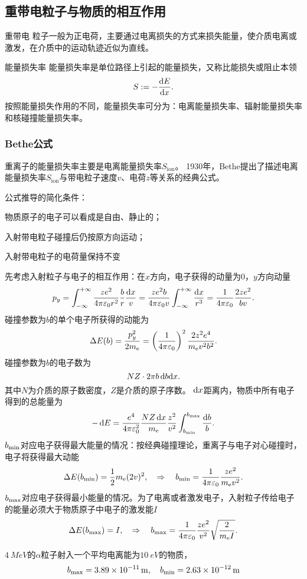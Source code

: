 \subsection{重带电粒子与物质的相互作用}
重带电 粒子一般为正电荷，主要通过电离损失的方式来损失能量，使介质电离或激发，在介质中的运动轨迹近似为直线。
\begin{definition}{能量损失率}{}
	能量损失率是单位路径上引起的能量损失，又称比能损失或阻止本领
	\begin{align}
		S:=-\frac{\mathrm{d}^{\;\!\!}E}{\mathrm{d} x^{\;\!\!}}.
	\end{align}
	按照能量损失作用的不同，能量损失率可分为：电离能量损失率、辐射能量损失率和核碰撞能量损失率。
\end{definition}
\subsubsection{Bethe公式}
重离子的能量损失率主要是电离能量损失率$S_{\mathrm{ion}}$。
1930年，Bethe提出了描述电离能量损失率$S_{\mathrm{ion}}$与带电粒子速度$v$、电荷$z$等关系的经典公式。

公式推导的简化条件：
\begin{compactenum}
	\item 物质原子的电子可以看成是自由、静止的；
	\item 入射带电粒子碰撞后仍按原方向运动；
	\item 入射带电粒子的电荷量保持不变
\end{compactenum}

先考虑入射粒子与电子的相互作用：在$x$方向，电子获得的动量为0，$y$方向动量 
\[
	p_y=\int_{-\infty}^{+\infty}\frac{ze^2}{4\pi\varepsilon_0r^2}\frac br\frac{\mathop{}\!\mathrm{d} x}v=\frac{ze^2b}{4\pi\varepsilon_0v}\int_{-\infty}^{+\infty}\frac{\mathop{}\!\mathrm{d} x}{r^3}=\frac1{4\pi\varepsilon_0}\frac{2ze^2}{bv}.
\]
碰撞参数为$b$的单个电子所获得的动能为
\[
	\Delta E(b)=\frac{p_y^2}{2m_\mathrm e}=\left(\frac1{4\pi\varepsilon_0}\right)^2\frac{2z^2e^4}{m_\mathrm e v^2b^2}.
\]
碰撞参数为$b$的电子数为
\[
	NZ\cdot 2\pi b\mathop{}\!\mathrm{d} b\mathrm{d} x.
\]
其中$N$为介质的原子数密度，$Z$是介质的原子序数。
\newpage
$\mathop{}\!\mathrm{d} x$距离内，物质中所有电子得到的总能量为
\[
	-\mathop{}\!\mathrm{d} E=\frac{e^4}{4\pi\varepsilon_0^2}\frac{NZ\mathop{}\!\mathrm{d} x}{m_\mathrm e}\frac{z^2}{v^2}\int_{b_\mathrm{min}}^{b_\mathrm{max}}\frac{\mathop{}\!\mathrm{d} b}b.
\]
$b_\mathrm{min}$对应电子获得最大能量的情况：按经典碰撞理论，重离子与电子对心碰撞时，电子将获得最大动能
\[
	\Delta E(b_\mathrm{min})=\frac12m_\mathrm e(2v)^2,\quad\Rightarrow\quad b_\mathrm{min}=\frac1{4\pi\varepsilon_0}\frac{ze^2}{m_\mathrm e v^2}.
\]
$b_\mathrm{max}$对应电子获得最小能量的情况。为了电离或者激发电子，入射粒子传给电子的能量必须大于物质原子中电子的激发能$I$
\[
	\Delta E(b_\mathrm{max})=I,\quad\Rightarrow\quad b_\mathrm{max}=\frac1{4\pi\varepsilon_0}\frac{ze^2}{v^2}\sqrt{\frac2{m_\mathrm e I}}.
\]
\begin{example}{}{}
	$\SI{4}{MeV}$的$\alpha$粒子射入一个平均电离能为$\SI{10}{eV}$的物质，
	\[
		b_\mathrm{max}=\SI{3.89e-11}{m},\quad b_\mathrm{min}=\SI{2.63e-12}{m}
	\]
\end{example}


